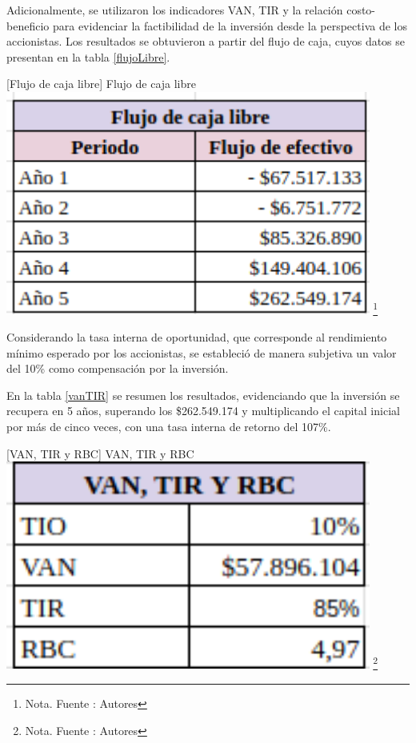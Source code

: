 Adicionalmente, se utilizaron los indicadores VAN, TIR y la relación costo-beneficio para evidenciar la factibilidad de la inversión desde la perspectiva de los accionistas. Los resultados se obtuvieron a partir del flujo de caja, cuyos datos se presentan en la tabla \ref{flujoLibre}.

\vspace{2mm}
\begin{minipage}{0.9\textwidth}
\centering
{}[{Flujo de caja libre}]{ Flujo de caja libre}
\label{flujoLibre}
\includegraphics[width=0.9\textwidth]{Content/Images/AF/FlujoDeCajaLibre.png}
\footnote{Nota. \textup{Fuente : Autores}}
\end{minipage}

Considerando la tasa interna de oportunidad, que corresponde al rendimiento mínimo esperado por los accionistas, se estableció de manera subjetiva un valor del 10\% como compensación por la inversión.

En la tabla \ref{vanTIR} se resumen los resultados, evidenciando que la inversión se recupera en 5 años, superando los \$262.549.174 y multiplicando el capital inicial por más de cinco veces, con una tasa interna de retorno del 107\%.

\vspace{2mm}
\begin{minipage}{0.9\textwidth}
\centering
{}[{VAN, TIR y RBC}]{ VAN, TIR y RBC}
\label{vanTIR}
\includegraphics[width=0.9\textwidth]{Content/Images/AF/VanTirRbc.png}
\footnote{Nota. \textup{Fuente : Autores}}
\end{minipage}

